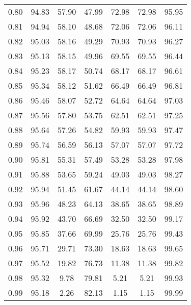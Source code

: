 \begin{tabular}{|c|c|c|c|c|c|c|}
      0.80 &     94.83 &     57.90 &      47.99 &   72.98 &      72.98 &         95.95 \\
      0.81 &     94.94 &     58.10 &      48.68 &   72.06 &      72.06 &         96.11 \\
      0.82 &     95.03 &     58.16 &      49.29 &   70.93 &      70.93 &         96.27 \\
      0.83 &     95.13 &     58.15 &      49.96 &   69.55 &      69.55 &         96.44 \\
      0.84 &     95.23 &     58.17 &      50.74 &   68.17 &      68.17 &         96.61 \\
      0.85 &     95.34 &     58.12 &      51.62 &   66.49 &      66.49 &         96.81 \\
      0.86 &     95.46 &     58.07 &      52.72 &   64.64 &      64.64 &         97.03 \\
      0.87 &     95.56 &     57.80 &      53.75 &   62.51 &      62.51 &         97.25 \\
      0.88 &     95.64 &     57.26 &      54.82 &   59.93 &      59.93 &         97.47 \\
      0.89 &     95.74 &     56.59 &      56.13 &   57.07 &      57.07 &         97.72 \\
      0.90 &     95.81 &     55.31 &      57.49 &   53.28 &      53.28 &         97.98 \\
      0.91 &     95.88 &     53.65 &      59.24 &   49.03 &      49.03 &         98.27 \\
      0.92 &     95.94 &     51.45 &      61.67 &   44.14 &      44.14 &         98.60 \\
      0.93 &     95.96 &     48.23 &      64.13 &   38.65 &      38.65 &         98.89 \\
      0.94 &     95.92 &     43.70 &      66.69 &   32.50 &      32.50 &         99.17 \\
      0.95 &     95.85 &     37.66 &      69.99 &   25.76 &      25.76 &         99.43 \\
      0.96 &     95.71 &     29.71 &      73.30 &   18.63 &      18.63 &         99.65 \\
      0.97 &     95.52 &     19.82 &      76.73 &   11.38 &      11.38 &         99.82 \\
      0.98 &     95.32 &      9.78 &      79.81 &    5.21 &       5.21 &         99.93 \\
      0.99 &     95.18 &      2.26 &      82.13 &    1.15 &       1.15 &         99.99 \\
\bottomrule
\end{tabular}
